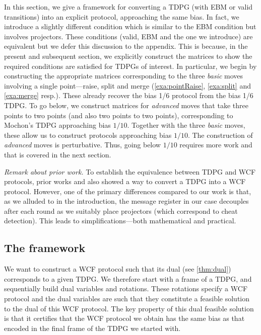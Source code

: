 \documentclass{article}
\newcommand{\atul}[1]{#1} %
\begin{document}
In this section, we give a framework for converting a TDPG (with EBM or valid transitions) into an explicit protocol, approaching the same bias. In fact, we introduce a slightly different condition which is similar to the EBM condition but involves projectors. These conditions (valid, EBM and the one we introduce) are equivalent but we defer this discussion to the appendix. %
This is because, in the present and subsequent section, we explicitly construct the matrices to show the required conditions are satisfied for TDPGs of interest. In particular, we begin by constructing the appropriate matrices corresponding to the three \emph{basic} moves involving a single point---raise, split and merge (\cref{exa:pointRaise}, \cref{exa:split} and \cref{exa:merge} resp.). These already recover the bias 1/6 protocol from the bias 1/6 TDPG. To go below, we construct matrices for \emph{advanced} moves that take three points to two points (and also two points to two points), corresponding to Mochon's TDPG approaching bias $1/10$. Together with the three \emph{basic} moves, these allow us to construct protocols approaching bias $1/10$. The construction of \emph{advanced} moves is perturbative. Thus, going below $1/10$ requires more work and that is covered in the next section. %

%
%
%
%


\emph{Remark about prior work.} To establish the equivalence between TDPG and WCF protocols, prior works \cite{ACG+14} and \cite{Mochon07} also showed a way to convert a TDPG into a WCF protocol. However, one of the primary differences compared to our work is that, as we \atul{alluded to in the introduction,} %
the message register in our case decouples after each round as we suitably place projectors (which correspond to cheat detection). This leads to simplifications---both mathematical and practical.

%
%

%

%
%


%
%
%
%

%
%
%
%
%
%
%


\subsection{The framework}
\label{subsec:framework}

We want to construct a WCF protocol such that its dual (see \cref{thm:dual}) corresponds to a given TDPG. We therefore start with a frame of a TDPG, and \atul{
  sequentially build dual variables and rotations. These rotations specify a WCF protocol and the dual variables are such that they constitute a feasible solution to the dual of this WCF protocol. The key property of this dual feasible solution is that it certifies that the WCF protocol we obtain has the same bias as that encoded in the final frame of the TDPG we started with.}
%
\end{document}
